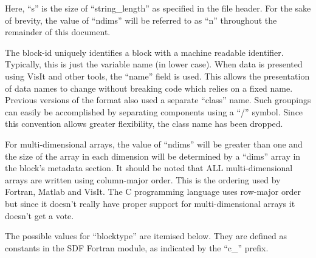 \documentclass[12pt]{article}
\begin{document}
Here, ``s'' is the size of ``string\_length'' as specified in the file header.
For the sake of brevity, the value of ``ndims'' will be referred to as ``n''
throughout the remainder of this document.

The block-id uniquely identifies a block with a machine readable identifier.
Typically, this is just the variable name (in lower case). When data is
presented using VisIt and other tools, the ``name'' field is used. This
allows the presentation of data names to change without breaking code which
relies on a fixed name. Previous versions of the format also used a separate
``class'' name. Such groupings can easily be accomplished by separating
components using a ``/'' symbol. Since this convention allows greater
flexibility, the class name has been dropped.

For multi-dimensional arrays, the value of ``ndims'' will be greater than
one and the size of the array in each dimension will be determined by a
``dims'' array in the block's metadata section. It should be noted that
ALL multi-dimensional arrays are written using column-major order. This is
the ordering used by Fortran, Matlab and VisIt. The C programming language
uses row-major order but since it doesn't really have proper support for
multi-dimensional arrays it doesn't get a vote.

The possible values for ``blocktype'' are itemised below. They are defined
as constants in the SDF Fortran module, as indicated by the ``c\_'' prefix.\\
\end{document}
